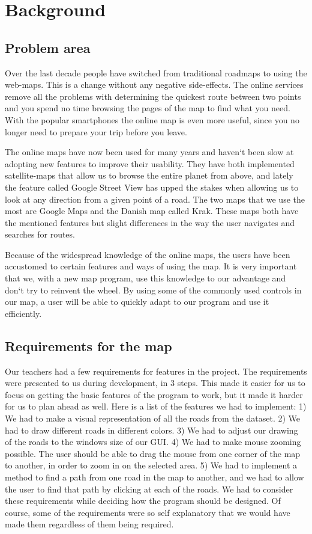 \chapter{Background}
\label{BG}
\section{Problem area}
\label{BG-PR}
Over the last decade people have switched from traditional roadmaps 
to using the web-maps. This is a change without any negative side-effects. 
The online services remove all the problems with determining the quickest 
route between two points and you spend no time browsing the pages of 
the map to find what you need. With the popular smartphones the online 
map is even more useful, since you no longer need to prepare your trip 
before you leave.

The online maps have now been used for many years and haven`t been slow 
at adopting new features to improve their usability. They have both 
implemented satellite-maps that allow us to browse the entire planet 
from above, and lately the feature called Google Street View has upped 
the stakes when allowing us to look at any direction from a given point 
of a road. The two maps that we use the most are Google Maps and the 
Danish map called Krak. These maps both have the mentioned features 
but slight differences in the way the user navigates and searches 
for routes.

Because of the widespread knowledge of the online maps, the users 
have been accustomed to certain features and ways of using the map. 
It is very important that we, with a new map program, use this knowledge 
to our advantage and don`t try to reinvent the wheel. By using some 
of the commonly used controls in our map, a user will be able to quickly 
adapt to our program and use it efficiently. 

\section{Requirements for the map}
Our teachers had a few requirements for features in the project. The requirements were presented to us during development, in 3 steps. This made
it easier for us to focus on getting the basic features of the program to work,
but it made it harder for us to plan ahead as well.  Here is a list of the
features we had to implement: 1) We had to make a visual representation of all
the roads from the dataset. 2) We had to draw different roads in different
colors. 3) We had to adjust our drawing of the roads to the windows size of
our GUI. 4) We had to make mouse zooming possible.  The user should be able to
drag the mouse from one corner of the map to another, in order to zoom in on
the selected area. 5) We had to implement a method to find a path from one road
in the map to another, and we had to allow the user to find that path by
clicking at each of the roads. We had to consider these requirements while
deciding how the program should be designed. Of course, some of the
requirements were so self explanatory that we would have made them regardless
of them being required.

